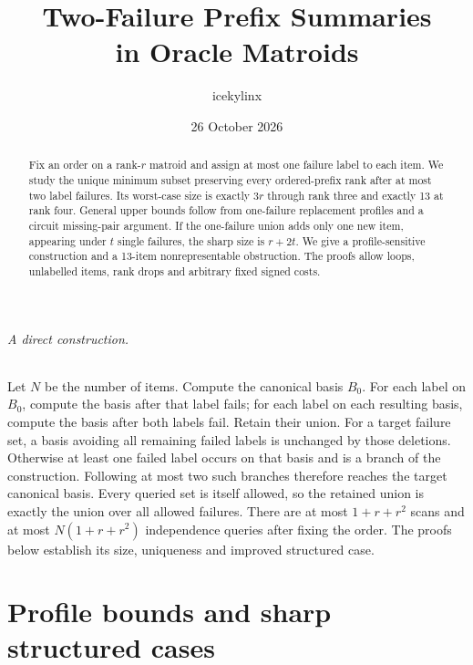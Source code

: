 
\providecommand{\tightlist}{\setlength{\itemsep}{0pt}\setlength{\parskip}{0pt}}
\title{Two-Failure Prefix Summaries\\in Oracle Matroids}
\author{icekylinx}
\date{26 October 2026}

\maketitle
\begin{abstract}
Fix an order on a rank-\(r\) matroid and assign at most one failure label to
each item. We study the unique minimum subset preserving every ordered-prefix
rank after at most two label failures. Its worst-case size is exactly \(3r\)
through rank three and exactly 13 at rank four. General upper bounds follow
from one-failure replacement profiles and a circuit missing-pair argument.
If the one-failure union adds only one new item, appearing under \(t\)
single failures, the sharp size is \(r+2t\). We give a profile-sensitive
construction and a 13-item nonrepresentable obstruction. The proofs allow
loops, unlabelled items, rank drops and arbitrary fixed signed costs.
\end{abstract}

\paragraph{A direct construction.}
Let \(N\) be the number of items. Compute the canonical basis \(B_0\).
For each label on \(B_0\), compute the basis after that label fails; for
each label on each resulting basis, compute the basis after both labels
fail. Retain their union. For a target failure set, a basis avoiding all
remaining failed labels is unchanged by those deletions. Otherwise at least
one failed label occurs on that basis and is a branch of the construction.
Following at most two such branches therefore reaches the target canonical
basis. Every queried set is itself allowed, so the retained union is exactly
the union over all allowed failures. There are at most \(1+r+r^2\) scans
and at most \(N(1+r+r^2)\) independence queries after fixing the order.
The proofs below establish its size, uniqueness and improved structured case.

\part{Profile bounds and sharp structured cases}
\setcounter{section}{0}
\renewcommand{\thesection}{\thepart.\arabic{section}}


